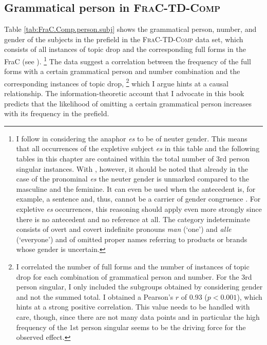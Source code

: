 \subsection{Grammatical person in \textsc{FraC-TD-Comp}}\label{sec:frac.td.comp.person}
Table \ref{tab:FraC.Comp.person.subj} shows the grammatical person, number, and gender of the subjects in the prefield in the \textsc{FraC-TD-Comp} data  set, which consists of all instances of topic drop and the corresponding full forms in the FraC (see ).%
\footnote{I follow \citet[43]{zifonun1995} in considering the anaphor \textit{es} to be of neuter gender.
This means that all occurrences of the expletive  subject \textit{es} in this table and the following tables in this chapter are contained within the total number of 3rd person singular instances.
With \citet[68]{eisenberg2002}, however, it should be noted that already in the case of the pronominal \textit{es} the neuter gender is unmarked compared to the masculine and the feminine.
It can even be used when the antecedent  is, for example, a sentence and, thus, cannot be a carrier of gender congruence \citep[68]{eisenberg2002}.
For expletive  \textit{es} occurrences, this reasoning should apply even more strongly since there is no antecedent and no reference at all. 
The category indeterminate consists of overt and covert indefinite pronouns \textit{man} (`one') and \textit{alle} (`everyone') and of omitted proper names referring to products or brands whose gender is uncertain.}
%
The data suggest a correlation between the frequency of the full forms with a certain grammatical person and number combination and the corresponding instances of topic drop,%
\footnote{I correlated the number of full forms and the number of instances of topic drop for each combination of grammatical person and number.
For the 3rd person singular, I only included the subgroups obtained by considering gender and not the summed total.
I obtained a Pearson's $r$ of $0.93$ ($p < 0.001$), which hints at a strong positive correlation.
This value needs to be handled with care, though, since there are not many data points and in particular the high frequency of the 1st person singular seems to be the driving force for the observed effect.}
%
which I argue hints at a causal relationship.
The information-theoretic account that I advocate in this book predicts that the likelihood of omitting a certain grammatical person increases with its frequency in the prefield.

